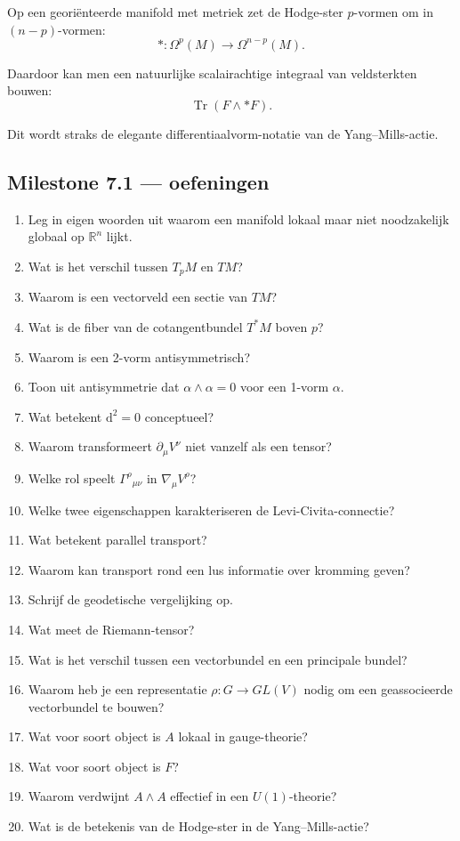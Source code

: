 \documentclass[11pt,a4paper]{article}
\newcommand{\dd}{\mathrm{d}}
\newcommand{\Tr}{\operatorname{Tr}}
\newcommand{\R}{\mathbb{R}}
\begin{document}
Op een georiënteerde manifold met metriek zet de Hodge-ster $p$-vormen om in $(n-p)$-vormen:
\[
*:\Omega^p(M)\to\Omega^{n-p}(M).
\]

Daardoor kan men een natuurlijke scalairachtige integraal van veldsterkten bouwen:
\[
\Tr(F\wedge *F).
\]

Dit wordt straks de elegante differentiaalvorm-notatie van de Yang--Mills-actie.

\subsection{Milestone 7.1 --- oefeningen}

\begin{enumerate}
\item Leg in eigen woorden uit waarom een manifold lokaal maar niet noodzakelijk globaal op $\R^n$ lijkt.
\item Wat is het verschil tussen $T_pM$ en $TM$?
\item Waarom is een vectorveld een sectie van $TM$?
\item Wat is de fiber van de cotangentbundel $T^*M$ boven $p$?
\item Waarom is een 2-vorm antisymmetrisch?
\item Toon uit antisymmetrie dat $\alpha\wedge\alpha=0$ voor een 1-vorm $\alpha$.
\item Wat betekent $\dd^2=0$ conceptueel?
\item Waarom transformeert $\partial_\mu V^\nu$ niet vanzelf als een tensor?
\item Welke rol speelt $\Gamma^\rho{}_{\mu\nu}$ in $\nabla_\mu V^\rho$?
\item Welke twee eigenschappen karakteriseren de Levi-Civita-connectie?
\item Wat betekent parallel transport?
\item Waarom kan transport rond een lus informatie over kromming geven?
\item Schrijf de geodetische vergelijking op.
\item Wat meet de Riemann-tensor?
\item Wat is het verschil tussen een vectorbundel en een principale bundel?
\item Waarom heb je een representatie $\rho:G\to GL(V)$ nodig om een geassocieerde vectorbundel te bouwen?
\item Wat voor soort object is $A$ lokaal in gauge-theorie?
\item Wat voor soort object is $F$?
\item Waarom verdwijnt $A\wedge A$ effectief in een $U(1)$-theorie?
\item Wat is de betekenis van de Hodge-ster in de Yang--Mills-actie?
\end{enumerate}
\end{document}
